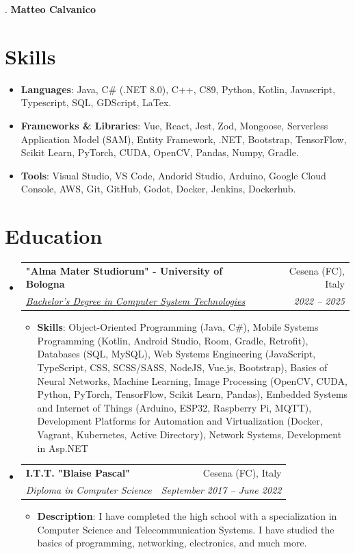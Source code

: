 \documentclass[letterpaper,11pt]{article}
\makeatletter
\newcommand{\resumeItem}[2]{
  \item\small{
    \textbf{#1}{: #2 \vspace{-2pt}}
  }
}
\newcommand{\resumeSubheading}[4]{
  \vspace{-1pt}\item
    \begin{tabular*}{0.97\textwidth}{l@{\extracolsep{\fill}}r}
      \textbf{#1} & #2 \\
      \textit{\small#3} & \textit{\small #4} \\
    \end{tabular*}\vspace{-5pt}
}
\newcommand{\resumeSubHeadingListStart}{\begin{itemize}[leftmargin=*]}
\newcommand{\resumeSubHeadingListEnd}{\end{itemize}}
\newcommand{\resumeItemListStart}{\begin{itemize}}
\newcommand{\resumeItemListEnd}{\end{itemize}\vspace{-5pt}}
\makeatother
\begin{document}
\setlength{\footskip}{5pt}.
\centering\textbf{\Large Matteo Calvanico} \\
  \vspace{0.25in}

\section{Skills}
\resumeSubHeadingListStart
  \item{
    \textbf{Languages}{: Java, C\# (.NET 8.0), C++, C89, Python, Kotlin, Javascript, Typescript, SQL, GDScript, LaTex.}
    \hfill
    }
  \item{
    \textbf{Frameworks \& Libraries}{: Vue, React, Jest, Zod, Mongoose, Serverless Application Model (SAM), Entity Framework, .NET, Bootstrap, TensorFlow, Scikit Learn, PyTorch, CUDA, OpenCV, Pandas, Numpy, Gradle.}
    \hfill
    }
  \item{
    \textbf{Tools}{: Visual Studio, VS Code, Andorid Studio, Arduino, Google Cloud Console, AWS, Git, GitHub, Godot, Docker, Jenkins, Dockerhub.}
    \hfill
    }
  \resumeSubHeadingListEnd

\section{Education}
  \resumeSubHeadingListStart
    \resumeSubheading
      {"Alma Mater Studiorum" - University of Bologna}{Cesena (FC), Italy}
      {\href{https://corsi.unibo.it/1cycle/ComputerSystemTechnologies}{\underline{Bachelor's Degree in Computer System Technologies}}}{2022 -- 2025}
      \resumeItemListStart
          \resumeItem{Skills}{Object-Oriented Programming (Java, C\#), Mobile Systems Programming (Kotlin, Android Studio, Room, Gradle, Retrofit), Databases (SQL, MySQL), Web Systems Engineering (JavaScript, TypeScript, CSS, SCSS/SASS, NodeJS, Vue.js, Bootstrap), Basics of Neural Networks, Machine Learning, Image Processing (OpenCV, CUDA, Python, PyTorch, TensorFlow, Scikit Learn, Pandas), 
          Embedded Systems and Internet of Things (Arduino, ESP32, Raspberry Pi, MQTT), Development Platforms for Automation and Virtualization (Docker, Vagrant, Kubernetes, Active Directory), Network Systems, Development in Asp.NET}
      \resumeItemListEnd
    \resumeSubheading
      {I.T.T. "Blaise Pascal"}{Cesena (FC), Italy}
      {Diploma in Computer Science}{September 2017 -- June 2022}
    \resumeItemListStart
	\resumeItem{Description}{I have completed the high school with a specialization in Computer Science and Telecommunication Systems. I have studied the basics of programming, networking, electronics, and much more.}
    \resumeItemListEnd
  \resumeSubHeadingListEnd
\end{document}
